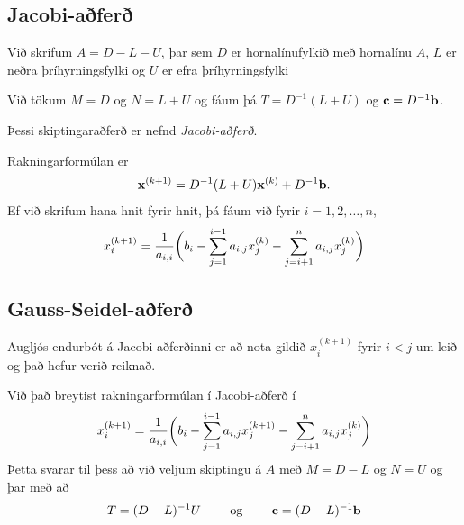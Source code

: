 \documentclass[letterpaper,10pt,icelandic]{sphinxmanual}
\begin{document}
\subsection{Jacobi-aðferð}
\label{kafli08:index-22}\label{kafli08:jacobi-afer}
Við skrifum \(A=D-L-U\), þar sem \(D\) er hornalínufylkið með
hornalínu \(A\), \(L\) er neðra þríhyrningsfylki og \(U\) er
efra þríhyrningsfylki

Við tökum \(M=D\) og \(N=L+U\) og fáum þá \(T=D^{-1}(L+U)\)
og \(\mbox{${\bf c}$}=D^{-1}\mbox{${\bf b}$}\).

Þessi skiptingaraðferð er nefnd \emph{Jacobi-aðferð}.

Rakningarformúlan er
\begin{gather}
\begin{split}\mbox{${\bf x}$}^{(k+1)}=D^{-1}(L+U)\mbox{${\bf x}$}^{(k)}+D^{-1}\mbox{${\bf b}$}.\end{split}\notag
\end{gather}
Ef við skrifum hana hnit fyrir hnit, þá fáum við fyrir
\(i=1,2,\dots,n\),
\begin{gather}
\begin{split}x_i^{(k+1)}=\dfrac 1{a_{i,i}}\bigg(
b_i-\sum_{j=1}^{i-1}a_{i,j}x_j^{(k)}-\sum_{j=i+1}^n a_{i,j}x_j^{(k)}\bigg)\end{split}\notag
\end{gather}

\subsection{Gauss-Seidel-aðferð}
\label{kafli08:index-23}\label{kafli08:gauss-seidel-afer}
Augljós endurbót á Jacobi-aðferðinni er að nota gildið
\(x_i^{(k+1)}\) fyrir \(i<j\) um leið og það hefur verið
reiknað.

Við það breytist rakningarformúlan í Jacobi-aðferð í
\begin{gather}
\begin{split}x_i^{(k+1)}=\dfrac 1{a_{i,i}}\bigg(
b_i-\sum_{j=1}^{i-1}a_{i,j}x_j^{(k+1)}-\sum_{j=i+1}^n a_{i,j}x_j^{(k)}\bigg)\end{split}\notag
\end{gather}
Þetta svarar til þess að við veljum skiptingu á \(A\) með
\(M=D-L\) og \(N=U\) og þar með að
\begin{gather}
\begin{split}T=(D-L)^{-1}U \qquad \text{ og } \qquad \mbox{${\bf c}$}=(D-L)^{-1} \mbox{${\bf b}$}\end{split}\notag
\end{gather}
\end{document}
